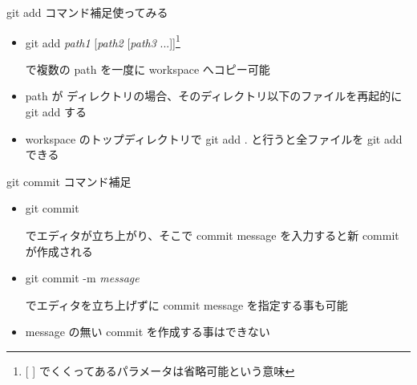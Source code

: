 \begin{frame}[t]{git add コマンド補足}{使ってみる}

  \begin{itemize}
  \item git add \textit{path1} [\textit{path2} [\textit{path3} ...]]\footnote{[ ] でくくってあるパラメータは省略可能という意味}

    で複数の path を一度に workspace へコピー可能
    \vspace{2ex}

  \item path が ディレクトリの場合、そのディレクトリ以下のファイルを再起的に git add する
    \vspace{2ex}

  \item workspace のトップディレクトリで git add . と行うと全ファイルを git add できる
  \end{itemize}

\end{frame}


\begin{frame}[t]{git commit コマンド補足}{}

  \begin{itemize}
  \item git commit

    でエディタが立ち上がり、そこで commit message を入力すると新 commit が作成される
    \vspace{2ex}

  \item git commit -m \textit{message}

    でエディタを立ち上げずに commit message を指定する事も可能
    \vspace{2ex}

  \item message の無い commit を作成する事はできない
  \end{itemize}

\end{frame}
